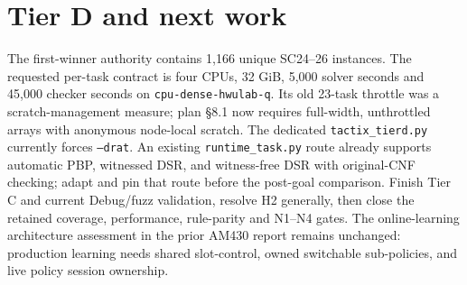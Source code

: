 \documentclass[10pt]{article}
\begin{document}
\section*{Tier D and next work}
The first-winner authority contains 1,166 unique SC24--26 instances. The
requested per-task contract is four CPUs, 32 GiB, 5,000 solver seconds and
45,000 checker seconds on \texttt{cpu-dense-hwulab-q}. Its old 23-task throttle
was a scratch-management measure; plan \S8.1 now requires full-width,
unthrottled arrays with anonymous node-local scratch. The dedicated
\texttt{tactix\_tierd.py} currently forces \texttt{--drat}. An existing
\texttt{runtime\_task.py} route already supports automatic PBP, witnessed
DSR, and witness-free DSR with original-CNF checking; adapt and pin that
route before the post-goal comparison. Finish Tier C and current Debug/fuzz
validation, resolve H2 generally, then close the retained coverage,
performance, rule-parity and N1--N4 gates. The online-learning architecture
assessment in the prior AM430 report remains unchanged: production learning
needs shared slot-control, owned switchable sub-policies, and live policy
session ownership.
\end{document}
